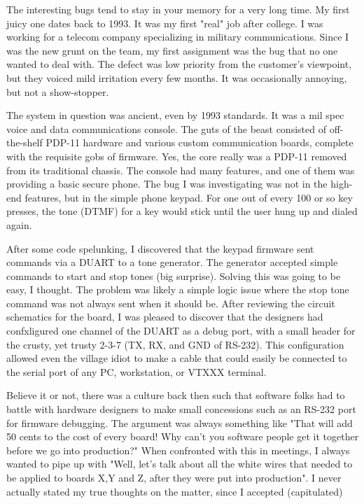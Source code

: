 The interesting bugs tend to stay in your memory for a very long time. My first
juicy one dates back to 1993. It was my first "real" job after college. I was
working for a telecom company specializing in military communications. Since I
was the new grunt on the team, my first assignment was the bug that no one
wanted to deal with. The defect was low priority from the customer's viewpoint,
but they voiced mild irritation every few months. It was occasionally annoying,
but not a show-stopper.
\par
The system in question was ancient, even by 1993 standards. It was a mil spec
voice and data communications console. The guts of the beast consisted of
off-the-shelf PDP-11 hardware and various custom communication boards, complete
with the requisite gobs of firmware. Yes, the core really was a PDP-11 removed
from its traditional chassis. The console had many features, and one of them was
providing a basic secure phone. The bug I was investigating was not in the
high-end features, but in the simple phone keypad. For one out of every 100 or
so key presses, the tone (DTMF) for a key would stick until the user hung up and
dialed again.
\par
After some code spelunking, I discovered that the keypad firmware sent commands
via a DUART to a tone generator. The generator accepted simple commands to start
and stop tones (big surprise). Solving this was going to be easy, I thought. The
problem was likely a simple logic issue where the stop tone command was not
always sent when it should be. After reviewing the circuit schematics for the
board, I was pleased to discover that the designers had confxligured one channel
of the DUART as a debug port, with a small header for the crusty, yet trusty
2-3-7 (TX, RX, and GND of RS-232). This configuration allowed even the village
idiot to make a cable that could easily be connected to the serial port of any
PC, workstation, or VTXXX terminal.
\par
Believe it or not, there was a culture back then such that software folks had to
battle with hardware designers to make small concessions such as an RS-232 port
for firmware debugging. The argument was always something like "That will add 50
cents to the cost of every board! Why can't you software people get it together
before we go into production?" When confronted with this in meetings, I always
wanted to pipe up with "Well, let's talk about all the white wires that needed
to be applied to boards X,Y and Z, after they were put into production". I never
actually stated my true thoughts on the matter, since I accepted (capitulated)
